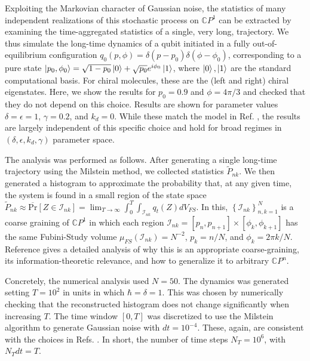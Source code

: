 \documentclass[draft,nofootinbib,pre,twocolumn,showpacs,showkeys,groupaddress,preprintnumbers,floatfix]{revtex4-1}
\newcommand{\1}{\mathbbm{1}}
\newcommand{\CP}[1]{\mathbb{C}P^{#1}}
\begin{document}
Exploiting the Markovian character of Gaussian noise, the statistics of many
independent realizations of this stochastic process on $\CP{1}$ can be
extracted by examining the time-aggregated statistics of a single, very long,
trajectory. We thus simulate the long-time dynamics of a qubit initiated in a
fully out-of-equilibrium configuration $q_0(p,\phi) = \delta (p-p_0) \delta
(\phi-\phi_0)$, corresponding to a pure state
$\ket{p_0,\phi_0}=\sqrt{1-p_0}\ket{0} + \sqrt{p_0}e^{i\phi_0}\ket{1}$, where
$\ket{0},\ket{1}$ are the standard computational basis. For chiral molecules,
these are the (left and right) chiral eigenstates. Here, we show the results
for $p_0 = 0.9$ and $\phi=4 \pi /3$ and checked that they do not depend on
this choice. Results are shown for parameter values $\delta = \epsilon = 1$,
$\gamma = 0.2$, and $k_d=0$. While these match the model in Ref.
\cite{Rod14,Rod13}, the results are largely independent of this specific
choice and hold for broad regimes in $(\delta,\epsilon,k_d,\gamma)$ parameter
space. 

The analysis was performed as follows. After generating a single long-time
trajectory using the Milstein method, we collected statistics
$\tilde{P}_{nk}$. We then generated a histogram to approximate the probability
that, at any given time, the system is found in a small region of the state
space $\tilde{P}_{nk} \approx \overline{\mathrm{Pr}}\left[Z \in
\mathcal{I}_{nk}\right]=\lim_{T \to \infty} \int_0^{T} \int_{\mathcal{I}_{nk}}
q_t(Z) dV_{FS}$. In this, $\left\{\mathcal{I}_{nk}\right\}_{n,k=1}^{N}$ is a
coarse graining of $\CP{1}$ in which each region $\mathcal{I}_{nk} =
[p_n,p_{n+1}] \times [\phi_k, \phi_{k+1}]$ has the same Fubini-Study volume
$\mu_{FS}(\mathcal{I}_{nk})=N^{-2}$, $p_k = n/N$, and
$\phi_k = 2\pi k/N$. Reference \cite{Anza21a} gives a detailed
analysis of why this is an appropriate coarse-graining, its
information-theoretic relevance, and how to generalize it to arbitrary $\CP{n}$.

Concretely, the numerical analysis used $N=50$. The dynamics was generated
setting $T=10^2$ in units in which $\hbar=\delta=1$. This was chosen by
numerically checking that the reconstructed histogram does not change
significantly when increasing $T$. The time window $[0,T]$ was discretized to
use the Milstein algorithm to generate Gaussian noise with $dt = 10^{-4}$.
These, again, are consistent with the choices in Refs. \cite{Rod14,Rod13}. In
short, the number of time steps $N_T = 10^6$, with $N_T dt = T$.
\end{document}

